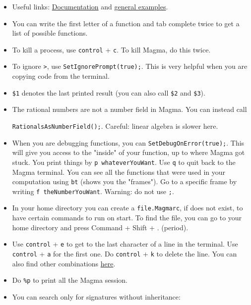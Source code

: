 \documentclass[12pt]{article}
\begin{document}
\begin{itemize}
\item Useful links: \href{http://magma.maths.usyd.edu.au/magma/handbook/}{Documentation} and \href{http://magma.maths.usyd.edu.au/magma/pdf/examples.pdf}{general examples}.

\item You can write the first letter of a function and tab complete twice to get a list of possible functions.
\item To kill a process, use  \verb|control| + \verb|c|. To kill \textsf{Magma}, do this twice.
\item To ignore \verb|>|, use \verb|SetIgnorePrompt(true);|. This is very helpful when you are copying code from the terminal.
\item \verb|$1| denotes the last printed result (you can also call \verb|$2| and \verb|$3|).
\item The rational numbers are not a number field in \textsf{Magma}. You can instead call

\verb|RationalsAsNumberField();|.  Careful: linear algebra is slower here.

\item When you are debugging functions, you can \verb|SetDebugOnError(true);|. This will give you access to the "inside" of your function, up to where \textsf{Magma} got stuck. You print things by \verb|p whateverYouWant|.  Use \verb|q| to quit back to the \textsf{Magma} terminal.  You can see all the functions that were used in your computation using \verb|bt| (shows you the "frames").  Go to a specific frame by writing \verb|f theNumberYouWant|.  Warning: do not use \verb|;|.

\item In your home directory you can create a \verb|file.Magmarc|, if does not exist, to have certain commands to run on start.  To find the file, you can go to your home directory and press Command + Shift + . (period).


\item Use \verb|control| + \verb|e| to get to the last character of a line in the terminal. Use \verb|control| + \verb|a| for the first one. Do \verb|control| + \verb|k| to delete the line.  You can also find other combinations \href{http://magma.maths.usyd.edu.au/magma/handbook/text/53}{here}.

\item Do \verb|%p| to print all the Magma session.
\item You can search only for signatures without inheritance:


\end{itemize}
\end{document}
